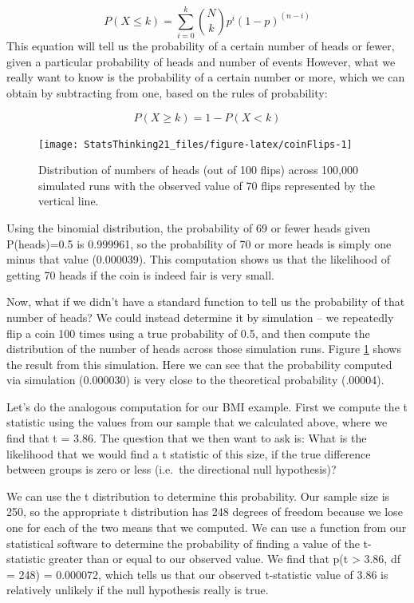 \documentclass[12pt,]{book}
\theoremstyle{definition}
\theoremstyle{definition}
\theoremstyle{definition}
\theoremstyle{remark}
\begin{document}
\[
P(X \le k) = \sum_{i=0}^k \binom{N}{k} p^i (1-p)^{(n-i)}
\]
This equation will tell us the probability of a certain number of heads or fewer, given a particular probability of heads and number of events However, what we really want to know is the probability of a certain number or more, which we can obtain by subtracting from one, based on the rules of probability:

\[
P(X \ge k) = 1 - P(X < k)
\]

\begin{figure}
\texttt{[image: StatsThinking21\_files/figure-latex/coinFlips-1]} \caption{Distribution of numbers of heads (out of 100 flips) across 100,000 simulated runs with the observed value of 70 flips represented by the vertical line.}\label{fig:coinFlips}
\end{figure}

Using the binomial distribution, the probability of 69 or fewer heads given P(heads)=0.5 is 0.999961, so the probability of 70 or more heads is simply one minus that value (0.000039).
This computation shows us that the likelihood of getting 70 heads if the coin is indeed fair is very small.

Now, what if we didn't have a standard function to tell us the probability of that number of heads? We could instead determine it by simulation -- we repeatedly flip a coin 100 times using a true probability of 0.5, and then compute the distribution of the number of heads across those simulation runs. Figure \ref{fig:coinFlips} shows the result from this simulation. Here we can see that the probability computed via simulation (0.000030) is very close to the theoretical probability (.00004).

Let's do the analogous computation for our BMI example. First we compute the t statistic using the values from our sample that we calculated above, where we find that t = 3.86. The question that we then want to ask is: What is the likelihood that we would find a t statistic of this size, if the true difference between groups is zero or less (i.e.~the directional null hypothesis)?

We can use the t distribution to determine this probability. Our sample size is 250, so the appropriate t distribution has 248 degrees of freedom because we lose one for each of the two means that we computed. We can use a function from our statistical software to determine the probability of finding a value of the t-statistic greater than or equal to our observed value. We find that p(t \textgreater{} 3.86, df = 248) = 0.000072, which tells us that our observed t-statistic value of 3.86 is relatively unlikely if the null hypothesis really is true.
\end{document}
